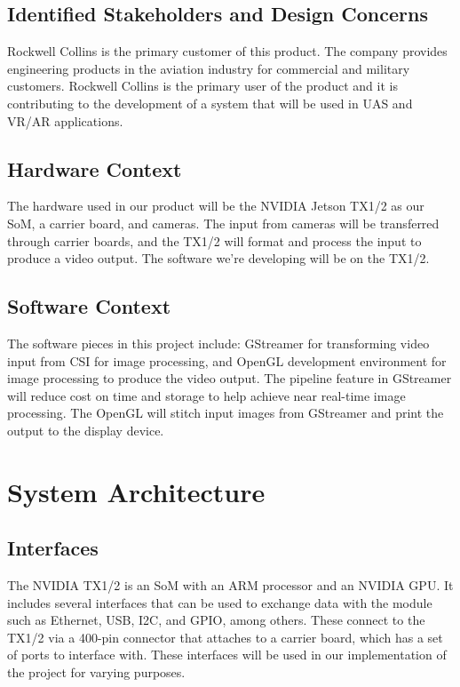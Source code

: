 \documentclass[letterpaper,10pt,serif,draftclsnofoot,onecolumn,compsoc,titlepage]{IEEEtran}
\begin{document}
\subsection{Identified Stakeholders and Design Concerns}

Rockwell Collins is the primary customer of this product. The company provides 
engineering products in the aviation industry for commercial and military customers. 
Rockwell Collins is the primary user of the product and it is contributing 
to the development of a system that will be used in UAS and VR/AR applications. \\

\subsection{Hardware Context}

The hardware used in our product will be the NVIDIA Jetson TX1/2 as our SoM, 
a carrier board, and cameras. The input from cameras will be transferred through 
carrier boards, and the TX1/2 will format and process the input to produce a 
video output. The software we're developing will be on the TX1/2. \\

\subsection{Software Context}

The software pieces in this project include: GStreamer for transforming video input 
from CSI for image processing, and OpenGL development environment for image processing 
to produce the video output. The pipeline feature in GStreamer will reduce 
cost on time and storage to help achieve near real-time image processing. The OpenGL 
will stitch input images from GStreamer and print the output to the display device. \\

\section{System Architecture}

\subsection{Interfaces}

The NVIDIA TX1/2 is an SoM with an ARM processor and an NVIDIA GPU. It includes several 
interfaces that can be used to exchange data with the module such as Ethernet, USB, 
I2C, and GPIO, among others. These connect to the TX1/2 via a 400-pin connector that 
attaches to a carrier board, which has a set of ports to interface with. These 
interfaces will be used in our implementation of the project for varying purposes. \\
\end{document}
